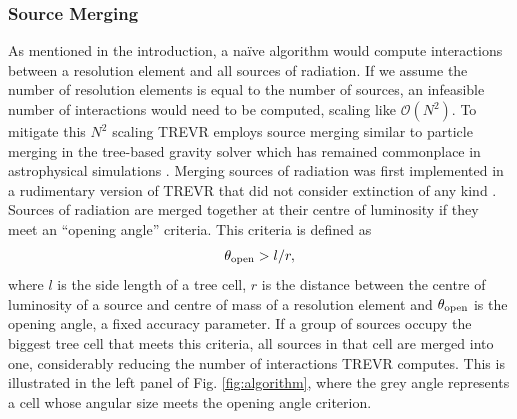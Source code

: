 \documentclass[fleq,usenatbib]{mnras}
\newcommand{\acro}{TREVR}
\newcommand{\bigO}[1]{\mathcal{O}\left(#1\right)}
\newcommand{\tO}{\theta_{\rm open}}
\begin{document}
\subsubsection{Source Merging}
As mentioned in the introduction, a na\"ive algorithm would compute 
interactions between a resolution element and  all sources of radiation. If we 
assume the number of resolution elements is equal to the number of sources, 
an infeasible number of interactions would need to be computed, scaling like 
$\bigO{N^2}$. To mitigate this $N^2$ scaling \acro{} employs source merging 
similar to particle merging in the \cite{barnesHut86} tree-based gravity 
solver which has remained commonplace in astrophysical simulations 
\citep{benz88,vineSigurdsson98,springelEt01,wadsleyEt03,hubberEt11}. Merging 
sources of radiation was first implemented in a rudimentary version of \acro{} 
that did not consider extinction of any kind \citep{kannanEt14}. Sources of 
radiation are merged together at their centre of luminosity if they meet an 
``opening angle'' criteria. This criteria is defined as 
\begin{equation}
\label{eqn:openangle}
\tO > l/r,
\end{equation}
where $l$ is the side length of a tree cell, $r$ is the distance between the 
centre of luminosity of a source and centre of mass of a resolution element 
and $\tO$ is the opening angle, a fixed accuracy parameter. If a 
group of sources occupy the biggest tree cell that meets this criteria, all 
sources in that cell are merged into one, considerably reducing the number of 
interactions \acro{} computes. This is illustrated in the left panel of Fig. 
\ref{fig:algorithm}, where the grey angle represents a cell whose angular size 
meets the opening angle criterion.
\end{document}
